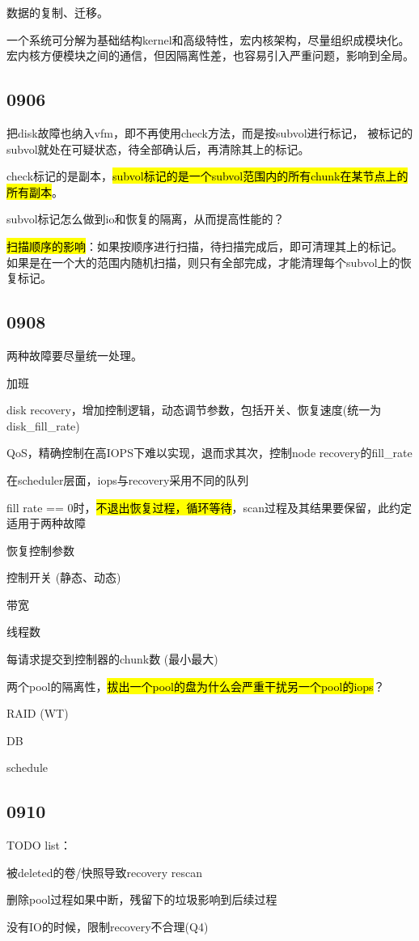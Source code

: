 数据的复制、迁移。

一个系统可分解为基础结构kernel和高级特性，宏内核架构，尽量组织成模块化。
宏内核方便模块之间的通信，但因隔离性差，也容易引入严重问题，影响到全局。

\subsection{0906}

把disk故障也纳入vfm，即不再使用check方法，而是按subvol进行标记，
被标记的subvol就处在可疑状态，待全部确认后，再清除其上的标记。

check标记的是副本，\hl{subvol标记的是一个subvol范围内的所有chunk在某节点上的所有副本}。

subvol标记怎么做到io和恢复的隔离，从而提高性能的？

\hl{扫描顺序的影响}：如果按顺序进行扫描，待扫描完成后，即可清理其上的标记。
如果是在一个大的范围内随机扫描，则只有全部完成，才能清理每个subvol上的恢复标记。

\subsection{0908}

两种故障要尽量统一处理。

加班
\begin{enumbox}
\item disk recovery，增加控制逻辑，动态调节参数，包括开关、恢复速度(统一为disk\_fill\_rate)
\item QoS，精确控制在高IOPS下难以实现，退而求其次，控制node recovery的fill\_rate
\item 在scheduler层面，iops与recovery采用不同的队列
\item fill rate == 0时，\hl{不退出恢复过程，循环等待}，scan过程及其结果要保留，此约定适用于两种故障
\end{enumbox}

恢复控制参数
\begin{enumbox}
\item 控制开关 (静态、动态)
\item 带宽
\item 线程数
\item 每请求提交到控制器的chunk数 (最小最大)
\end{enumbox}

两个pool的隔离性，\hl{拔出一个pool的盘为什么会严重干扰另一个pool的iops}？
\begin{enumbox}
\item RAID (WT)
\item DB
\item schedule
\end{enumbox}

\subsection{0910}

TODO list：
\begin{enumbox}
\item 被deleted的卷/快照导致recovery rescan
\item 删除pool过程如果中断，残留下的垃圾影响到后续过程
\item 没有IO的时候，限制recovery不合理(Q4)
\end{enumbox}
